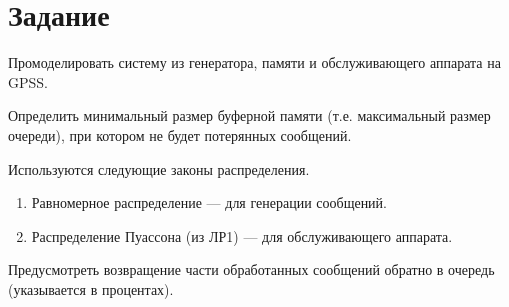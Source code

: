 \chapter{Задание}

Промоделировать систему из генератора, памяти и обслуживающего аппарата на GPSS.

Определить минимальный размер буферной памяти (т.е. максимальный размер очереди), при котором не будет потерянных сообщений.

Используются следующие законы распределения.
\begin{enumerate}
    \item Равномерное распределение --- для генерации сообщений.
    \item Распределение Пуассона (из ЛР1) --- для обслуживающего аппарата.
\end{enumerate}

Предусмотреть возвращение части обработанных сообщений обратно в очередь (указывается в процентах).
